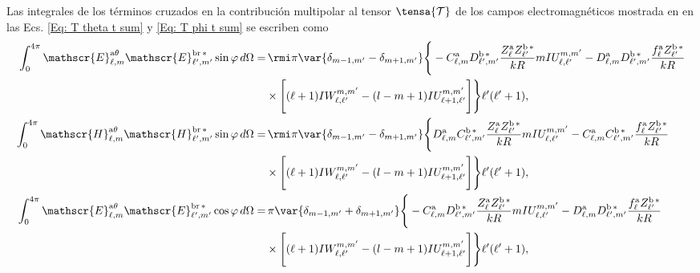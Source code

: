 Las integrales de los términos cruzados en la contribución multipolar al tensor $\tensa{\mathcal{T}}$ de los campos electromagnéticos mostrada en en las Ecs. \eqref{Eq: T theta t sum} y \eqref{Eq: T phi t sum} se escriben como
\begin{align}
\int_{0}^{4\pi} \mathscr{E}_{\ell, m}^{\text{a}\theta}\mathscr{E}_{\ell^{\prime}, m^{\prime}}^{\text{br}\,*} \sin\varphi \, d\Omega =& 
%
\, \rmi \pi \var{ \delta_{m-1, m^{\prime}} - \delta_{m+1, m^{\prime}} } \Bigg\{-C_{\ell,m}^{\rm a}D_{\ell^{\prime}, m^{\prime}}^{\rm b \, *}\frac{Z_{\ell}^{\rm a}Z_{\ell^{\prime}}^{\rm b\, *}}{k R} m IU_{\ell, \ell^{\prime}}^{m, m^{\prime}} 
%
-D_{\ell, m}^{\rm a}D_{\ell^{\prime}, m^{\prime}}^{\rm b \, *} \frac{f_{\ell}^{\rm a}Z_{\ell^{\prime}}^{\rm b \, *}}{k R} \nonumber \\
%
& \times \Bigg[ (\ell+1) IW_{\ell, \ell^{\prime}}^{m, m^{\prime}} 
%
-(l-m+1) IU_{\ell + 1, \ell^{\prime}}^{m, m^{\prime}} \Bigg] \Bigg\}\ell^{\prime}(\ell^{\prime}+1),\\
%
%
\int_{0}^{4\pi} \mathscr{H}_{\ell, m}^{\text{a}\theta}\mathscr{H}_{\ell^{\prime}, m^{\prime}}^{\text{br}\,*} \sin\varphi \, d\Omega =& 
%
\, \rmi \pi \var{ \delta_{m-1, m^{\prime}} - \delta_{m+1, m^{\prime}} } \Bigg\{D_{\ell,m}^{\rm a}C_{\ell^{\prime}, m^{\prime}}^{\rm b \, *}\frac{Z_{\ell}^{\rm a}Z_{\ell^{\prime}}^{\rm b\, *}}{k R} m IU_{\ell, \ell^{\prime}}^{m, m^{\prime}} 
%
-C_{\ell, m}^{\rm a}C_{\ell^{\prime}, m^{\prime}}^{\rm b \, *} \frac{f_{\ell}^{\rm a}Z_{\ell^{\prime}}^{\rm b \, *}}{k R} \nonumber \\
%
& \times \Bigg[ (\ell+1) IW_{\ell, \ell^{\prime}}^{m, m^{\prime}} 
%
-(l-m+1) IU_{\ell + 1, \ell^{\prime}}^{m, m^{\prime}} \Bigg] \Bigg\}\ell^{\prime}(\ell^{\prime}+1),\\
%
%
%
%
\int_{0}^{4\pi} \mathscr{E}_{\ell, m}^{\text{a}\theta}\mathscr{E}_{\ell^{\prime}, m^{\prime}}^{\text{br}\,*} \cos\varphi \, d\Omega =& 
%
\, \pi \var{ \delta_{m-1, m^{\prime}} + \delta_{m+1, m^{\prime}} } \Bigg\{-C_{\ell,m}^{\rm a}D_{\ell^{\prime}, m^{\prime}}^{\rm b \, *}\frac{Z_{\ell}^{\rm a}Z_{\ell^{\prime}}^{\rm b\, *}}{k R} m IU_{\ell, \ell^{\prime}}^{m, m^{\prime}} 
%
-D_{\ell, m}^{\rm a}D_{\ell^{\prime}, m^{\prime}}^{\rm b \, *} \frac{f_{\ell}^{\rm a}Z_{\ell^{\prime}}^{\rm b \, *}}{k R} \nonumber \\
%
& \times \Bigg[ (\ell+1) IW_{\ell, \ell^{\prime}}^{m, m^{\prime}} 
%
-(l-m+1) IU_{\ell + 1, \ell^{\prime}}^{m, m^{\prime}} \Bigg] \Bigg\}\ell^{\prime}(\ell^{\prime}+1),
%
\end{align}
